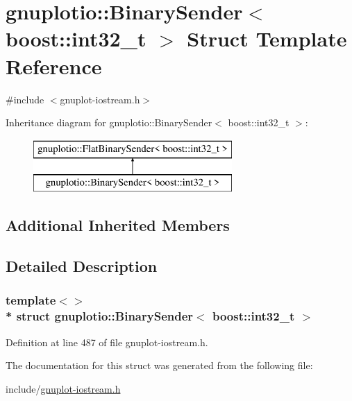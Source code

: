 \hypertarget{structgnuplotio_1_1_binary_sender_3_01boost_1_1int32__t_01_4}{}\section{gnuplotio\+:\+:Binary\+Sender$<$ boost\+:\+:int32\+\_\+t $>$ Struct Template Reference}
\label{structgnuplotio_1_1_binary_sender_3_01boost_1_1int32__t_01_4}


{\ttfamily \#include $<$gnuplot-\/iostream.\+h$>$}

Inheritance diagram for gnuplotio\+:\+:Binary\+Sender$<$ boost\+:\+:int32\+\_\+t $>$\+:\begin{figure}[H]
\begin{center}
\leavevmode
\includegraphics[height=2.000000cm]{structgnuplotio_1_1_binary_sender_3_01boost_1_1int32__t_01_4}
\end{center}
\end{figure}
\subsection*{Additional Inherited Members}


\subsection{Detailed Description}
\subsubsection*{template$<$$>$\\*
struct gnuplotio\+::\+Binary\+Sender$<$ boost\+::int32\+\_\+t $>$}



Definition at line 487 of file gnuplot-\/iostream.\+h.



The documentation for this struct was generated from the following file\+:\begin{DoxyCompactItemize}
\item 
include/\hyperlink{gnuplot-iostream_8h}{gnuplot-\/iostream.\+h}\end{DoxyCompactItemize}
